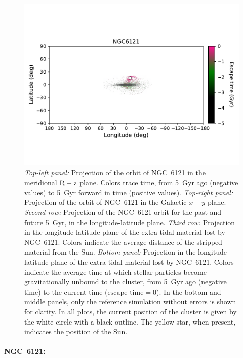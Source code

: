 \begin{figure}
\begin{center}
                    \includegraphics[clip=true, trim = 0mm 20mm 0mm 10mm, width=0.9\columnwidth]{images/PII_individual_NGC6121_NGC6121_LB_tesc.pdf}
                \end{center}
                \caption[]{ \emph{Top-left panel:} Projection of the orbit of NGC~6121 in the meridional $\rm R-z$ plane. Colors trace time, from 5~Gyr ago (negative values) to 5~Gyr forward in time (positive values). \emph{Top-right panel:} Projection of the orbit of NGC~6121 in the Galactic $x-y$ plane.  \emph{Second row:} Projection of the NGC~6121 orbit for the past and future 5~Gyr, in the longitude-latitude plane.   \emph{Third row:} Projection in the longitude-latitude plane of the extra-tidal material lost by NGC~6121. Colors indicate the average distance of the stripped material from the Sun.  \emph{Bottom panel:} Projection in the longitude-latitude plane of the extra-tidal material lost by NGC~6121. Colors indicate the average time at which stellar particles become gravitationally unbound to the cluster, from 5~Gyr ago (negative time) to the current time ($\textrm{escape time} = 0$). In the bottom and middle panels, only the reference simulation without errors is shown for clarity. In all plots, the current position of the cluster is given by the white circle with a black outline. The yellow star, when present, indicates the position of the Sun. }\label{ngc6121_stream}
            \end{figure}
            \onecolumn


            \paragraph{NGC~6121: }

